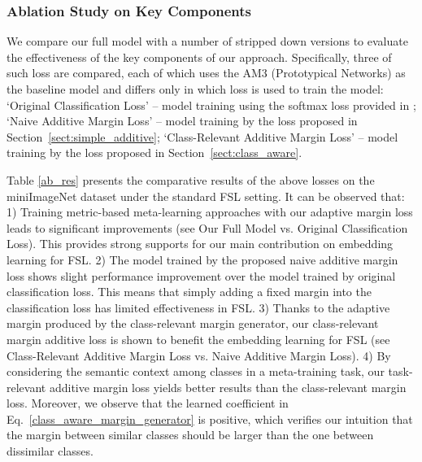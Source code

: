 \documentclass[10pt,twocolumn,letterpaper]{article}
\begin{document}
\subsubsection{Ablation Study on Key Components}
\label{ab}

 We compare our full model with a number of stripped down versions to evaluate the effectiveness of the key components of our approach. Specifically, three of such loss are compared, each of which uses the AM3 (Prototypical Networks) \cite{Chen2019NIPS} as the baseline model and differs only in which loss is used to train the model:  `Original Classification Loss' -- model training using the softmax loss provided in \cite{Chen2019NIPS}; `Naive Additive Margin Loss' -- model training by the loss proposed in Section~\ref{sect:simple_additive}; `Class-Relevant Additive Margin Loss' -- model training by the loss proposed in Section~\ref{sect:class_aware}. 
 
 Table \ref{ab_res} presents the comparative results of the above losses on the miniImageNet dataset under the standard FSL setting. It can be observed that: 1) Training metric-based meta-learning approaches with our adaptive margin loss leads to significant improvements (see Our Full Model vs. Original Classification Loss). This provides strong supports for our main contribution
on embedding learning for FSL. 2) The model trained by the proposed naive additive margin loss shows slight performance improvement over the model trained by original classification loss. This means that simply adding a fixed margin into the classification loss has limited effectiveness in FSL. 3) Thanks to the adaptive margin produced by the class-relevant margin generator, our class-relevant margin additive loss is shown to benefit the embedding learning for FSL (see Class-Relevant Additive Margin Loss vs. Naive Additive Margin Loss). 4) By considering the semantic context among classes in a meta-training task, our task-relevant additive margin loss yields better results than the class-relevant margin loss. 
Moreover, we observe that the learned coefficient  in Eq.~\eqref{class_aware_margin_generator} is positive, which verifies our intuition that the margin between similar classes should be larger than the one between dissimilar classes.
\end{document}

